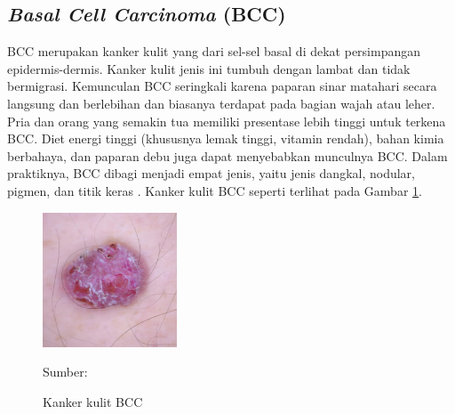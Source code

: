     \subsection{\textit{Basal Cell Carcinoma} (BCC)}
    BCC merupakan kanker kulit yang dari sel-sel basal di dekat persimpangan epidermis-dermis. Kanker kulit jenis ini tumbuh dengan lambat dan tidak bermigrasi. Kemunculan BCC seringkali karena paparan sinar matahari secara langsung dan berlebihan dan biasanya terdapat pada bagian wajah atau leher. Pria dan orang yang semakin tua memiliki presentase lebih tinggi untuk terkena BCC. Diet energi tinggi (khususnya lemak tinggi, vitamin rendah), bahan kimia berbahaya, dan paparan debu juga dapat menyebabkan munculnya BCC. Dalam praktiknya, BCC dibagi menjadi empat jenis, yaitu jenis dangkal, nodular, pigmen, dan titik keras \citep{Sang2019}. Kanker kulit BCC seperti terlihat pada Gambar \ref{fig:bcc}.
    \begin{figure}[H] 
        \begin{center} 
            \includegraphics[width=4cm]{img/bab2/bcc.jpg}
            \caption{Kanker kulit BCC} 
            \label{fig:bcc}
            Sumber: \citep{Codella2018,Combalia2019,Tschandl2018}
        \end{center} 
    \end{figure}

